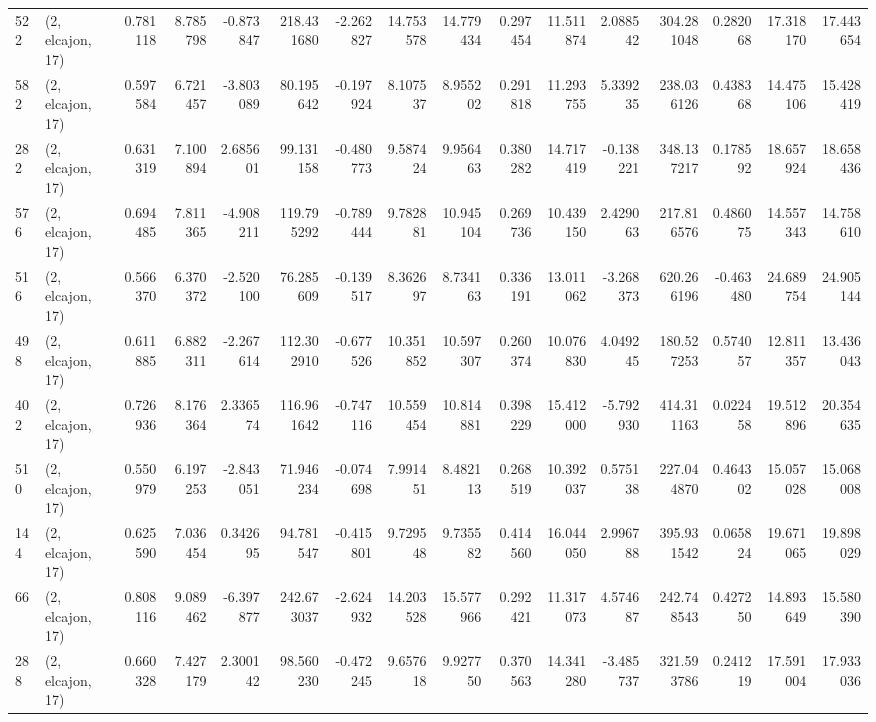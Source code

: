 \begin{tabular}{llrrrrrrrrrrrrrr}
522 &  (2, elcajon, 17) &   0.781118 &   8.785798 &  -0.873847 &   218.431680 &  -2.262827 &  14.753578 &  14.779434 &  0.297454 &  11.511874 &   2.088542 &   304.281048 &  0.282068 &  17.318170 &  17.443654 \\
582 &  (2, elcajon, 17) &   0.597584 &   6.721457 &  -3.803089 &    80.195642 &  -0.197924 &   8.107537 &   8.955202 &  0.291818 &  11.293755 &   5.339235 &   238.036126 &  0.438368 &  14.475106 &  15.428419 \\
282 &  (2, elcajon, 17) &   0.631319 &   7.100894 &   2.685601 &    99.131158 &  -0.480773 &   9.587424 &   9.956463 &  0.380282 &  14.717419 &  -0.138221 &   348.137217 &  0.178592 &  18.657924 &  18.658436 \\
576 &  (2, elcajon, 17) &   0.694485 &   7.811365 &  -4.908211 &   119.795292 &  -0.789444 &   9.782881 &  10.945104 &  0.269736 &  10.439150 &   2.429063 &   217.816576 &  0.486075 &  14.557343 &  14.758610 \\
516 &  (2, elcajon, 17) &   0.566370 &   6.370372 &  -2.520100 &    76.285609 &  -0.139517 &   8.362697 &   8.734163 &  0.336191 &  13.011062 &  -3.268373 &   620.266196 & -0.463480 &  24.689754 &  24.905144 \\
498 &  (2, elcajon, 17) &   0.611885 &   6.882311 &  -2.267614 &   112.302910 &  -0.677526 &  10.351852 &  10.597307 &  0.260374 &  10.076830 &   4.049245 &   180.527253 &  0.574057 &  12.811357 &  13.436043 \\
402 &  (2, elcajon, 17) &   0.726936 &   8.176364 &   2.336574 &   116.961642 &  -0.747116 &  10.559454 &  10.814881 &  0.398229 &  15.412000 &  -5.792930 &   414.311163 &  0.022458 &  19.512896 &  20.354635 \\
510 &  (2, elcajon, 17) &   0.550979 &   6.197253 &  -2.843051 &    71.946234 &  -0.074698 &   7.991451 &   8.482113 &  0.268519 &  10.392037 &   0.575138 &   227.044870 &  0.464302 &  15.057028 &  15.068008 \\
144 &  (2, elcajon, 17) &   0.625590 &   7.036454 &   0.342695 &    94.781547 &  -0.415801 &   9.729548 &   9.735582 &  0.414560 &  16.044050 &   2.996788 &   395.931542 &  0.065824 &  19.671065 &  19.898029 \\
66  &  (2, elcajon, 17) &   0.808116 &   9.089462 &  -6.397877 &   242.673037 &  -2.624932 &  14.203528 &  15.577966 &  0.292421 &  11.317073 &   4.574687 &   242.748543 &  0.427250 &  14.893649 &  15.580390 \\
288 &  (2, elcajon, 17) &   0.660328 &   7.427179 &   2.300142 &    98.560230 &  -0.472245 &   9.657618 &   9.927750 &  0.370563 &  14.341280 &  -3.485737 &   321.593786 &  0.241219 &  17.591004 &  17.933036 \\

\end{tabular}
